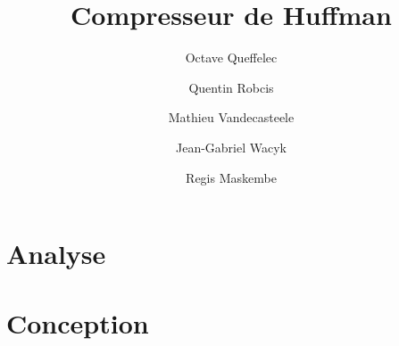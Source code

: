 \documentclass{article}
\title{Compresseur de Huffman}
\author{Octave Queffelec \and Quentin Robcis \and Mathieu Vandecasteele \and Jean-Gabriel Wacyk \and Regis Maskembe}
\begin{document}
\maketitle
\newpage


\tableofcontents
\newpage


\section{Analyse}


\section{Conception}


\end{document}
